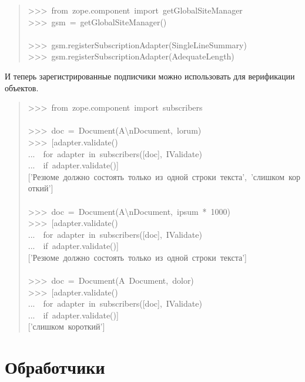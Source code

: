 \documentclass[14pt,a4paper,openany,twoside,final]{extbook}
\begin{document}
\begin{quote}{\ttfamily \raggedright \noindent
>{}>{}>~from~zope.component~import~getGlobalSiteManager\\
>{}>{}>~gsm~=~getGlobalSiteManager()\\
~\\
>{}>{}>~gsm.registerSubscriptionAdapter(SingleLineSummary)\\
>{}>{}>~gsm.registerSubscriptionAdapter(AdequateLength)
}
\end{quote}

И теперь зарегистрированные подписчики можно использовать для
верификации объектов.

\begin{quote}{\ttfamily \raggedright \noindent
>{}>{}>~from~zope.component~import~subscribers\\
~\\
>{}>{}>~doc~=~Document(\textquotedbl{}A\textbackslash{}nDocument\textquotedbl{},~\textquotedbl{}lorum\textquotedbl{})\\
>{}>{}>~{[}adapter.validate()\\
...~~for~adapter~in~subscribers({[}doc{]},~IValidate)\\
...~~if~adapter.validate(){]}\\
{[}'Резюме~должно~состоять~только~из~одной~строки~текста',~'слишком~короткий'{]}\\
~\\
>{}>{}>~doc~=~Document(\textquotedbl{}A\textbackslash{}nDocument\textquotedbl{},~\textquotedbl{}ipsum\textquotedbl{}~*~1000)\\
>{}>{}>~{[}adapter.validate()\\
...~~for~adapter~in~subscribers({[}doc{]},~IValidate)\\
...~~if~adapter.validate(){]}\\
{[}'Резюме~должно~состоять~только~из~одной~строки~текста'{]}\\
~\\
>{}>{}>~doc~=~Document(\textquotedbl{}A~Document\textquotedbl{},~\textquotedbl{}dolor\textquotedbl{})\\
>{}>{}>~{[}adapter.validate()\\
...~~for~adapter~in~subscribers({[}doc{]},~IValidate)\\
...~~if~adapter.validate(){]}\\
{[}'слишком~короткий'{]}
}
\end{quote}


\section{Обработчики%
  \label{id47}%
}
\end{document}
